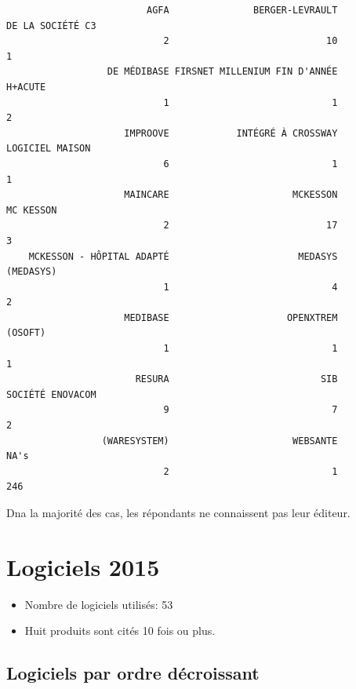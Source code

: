 \documentclass[]{article}
\begin{document}
\begin{verbatim}
                         AGFA               BERGER-LEVRAULT              DE LA SOCIÉTÉ C3 
                            2                            10                             1 
                  DE MÉDIBASE FIRSNET MILLENIUM FIN D'ANNÉE                       H+ACUTE 
                            1                             1                             2 
                     IMPROOVE            INTÉGRÉ À CROSSWAY               LOGICIEL MAISON 
                            6                             1                             1 
                     MAINCARE                      MCKESSON                     MC KESSON 
                            2                            17                             3 
    MCKESSON - HÔPITAL ADAPTÉ                       MEDASYS                     (MEDASYS) 
                            1                             4                             2 
                     MEDIBASE                     OPENXTREM                       (OSOFT) 
                            1                             1                             1 
                       RESURA                           SIB              SOCIÉTÉ ENOVACOM 
                            9                             7                             2 
                 (WARESYSTEM)                      WEBSANTE                          NA's 
                            2                             1                           246 
\end{verbatim}

Dna la majorité des cas, les répondants ne connaissent pas leur éditeur.

\section{Logiciels 2015}\label{logiciels-2015}

\begin{itemize}
\itemsep1pt\parskip0pt
\item
  Nombre de logiciels utilisés: 53
\item
  Huit produits sont cités 10 fois ou plus.
\end{itemize}

\subsection{Logiciels par ordre
décroissant}\label{logiciels-par-ordre-decroissant}
\end{document}
